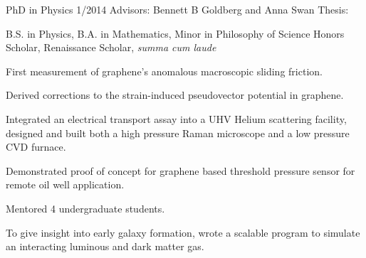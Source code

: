 {\begin{singlespace}
\bigspace

{
	\newline
	PhD in Physics 1/2014\newline
	Advisors: Bennett B Goldberg and Anna Swan \newline
	Thesis: \thesistitlelower 

	\newline
	B.S. in Physics, B.A. in Mathematics, Minor in Philosophy of Science\newline
	Honors Scholar, Renaissance Scholar, \emph{summa cum laude}\newline
}


{
	\begin{description}[noitemsep,topsep=-5pt,labelindent=15pt]
	\item[Experiment:] First measurement of graphene's anomalous macroscopic sliding friction. 
	\item[Theory:] Derived corrections to the strain-induced pseudovector potential in graphene.
	\item[Apparatus design:] Integrated an electrical transport assay into a UHV Helium scattering facility, designed and built both a high pressure Raman microscope and a low pressure CVD furnace.
	\item[Device:] Demonstrated proof of concept for graphene based threshold pressure sensor for remote oil well application.
	\item[Mentoring:] Mentored 4 undergraduate students.
	\end{description}
	\vspace{\sspace}

	 \newline
	To give insight into early galaxy formation, wrote a scalable program to simulate an interacting luminous and dark matter gas.
	 
}
\end{singlespace}}

